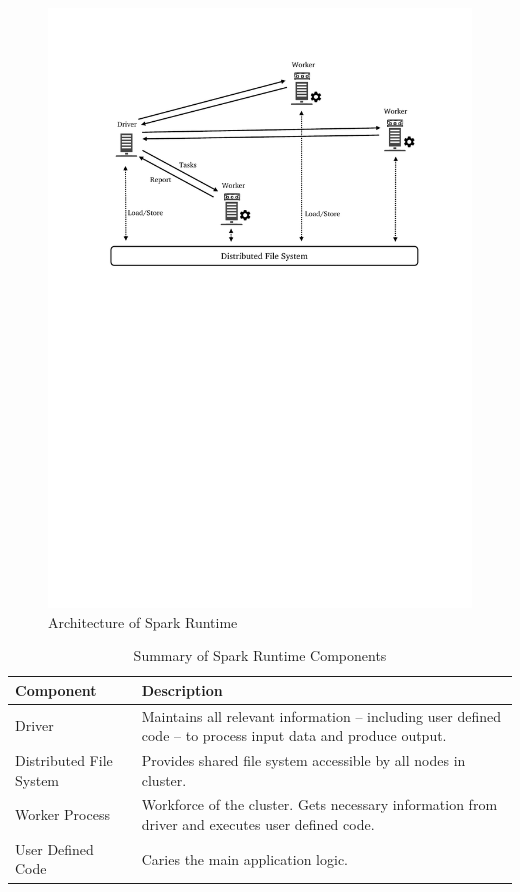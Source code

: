 \begin{figure}[h]
    \centering
    \includegraphics[clip,trim=3cm 16.8cm 2.5cm 2.5cm]{spark-high.pdf}
    \caption{Architecture of Spark Runtime}
    \label{fig:spark-runtime}
\end{figure}
\begin{table}[ht]
    \begin{tabularx}{\textwidth}{lX}
        \toprule
        \textbf{Component} & \textbf{Description}\\
        \midrule
        Driver & Maintains all relevant information -- including user defined code -- to process input data and produce output.\\
        Distributed File System & Provides shared file system accessible by all nodes in cluster.\\
        Worker Process & Workforce of the cluster. Gets necessary information from driver and executes user defined code.\\
        User Defined Code & Caries the main application logic.\\
        \bottomrule
    \end{tabularx}
    \centering
    \caption{Summary of Spark Runtime Components}
    \label{tab:spark-runtime}
\end{table}


